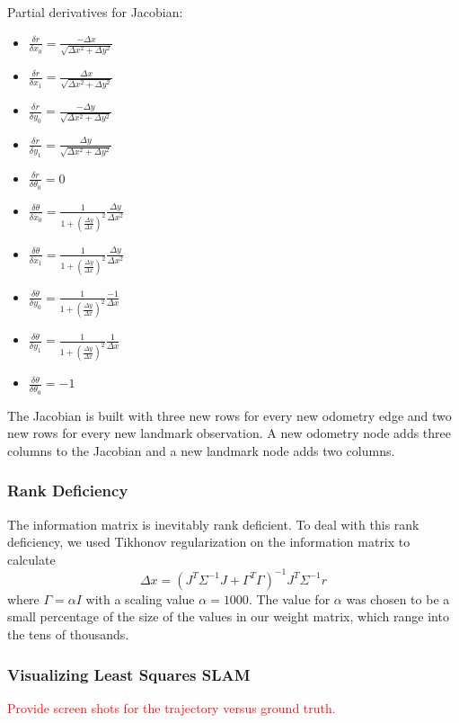 \documentclass[12pt]{article}
\begin{document}
Partial derivatives for Jacobian:
\begin{multicols}{2}
\begin{itemize}
	\item $\frac{\delta r}{\delta x_0} = \frac{- \Delta x}{\sqrt{\Delta x^2 + \Delta y^2}}$
	\item $\frac{\delta r}{\delta x_1} = \frac{\Delta x}{\sqrt{\Delta x^2 + \Delta y^2}}$
	\item $\frac{\delta r}{\delta y_0} = \frac{-\Delta y}{\sqrt{\Delta x^2 + \Delta y^2}}$
	\item $\frac{\delta r}{\delta y_1} = \frac{\Delta y}{\sqrt{\Delta x^2 + \Delta y^2}}$
	\item $\frac{\delta r}{\delta \theta_0} = 0$
	\item $\frac{\delta \theta}{\delta x_0} = \frac{1}{1 + (\frac{\Delta y}{\Delta x})^2}\frac{\Delta y}{\Delta x^2}$
	\item $\frac{\delta \theta}{\delta x_1} = \frac{1}{1 + (\frac{\Delta y}{\Delta x})^2}\frac{\Delta y}{\Delta x^2}$
	\item $\frac{\delta \theta}{\delta y_0} = \frac{1}{1 + (\frac{\Delta y}{\Delta x})^2}\frac{-1}{\Delta x}$
	\item $\frac{\delta \theta}{\delta y_1} = \frac{1}{1 + (\frac{\Delta y}{\Delta x})^2}\frac{1}{\Delta x}$
	\item $\frac{\delta \theta}{\delta \theta_0} = -1$
\end{itemize}
\end{multicols}

The Jacobian is built with three new rows for every new odometry edge and two new rows for every new landmark observation.
A new odometry node adds three columns to the Jacobian and a new landmark node adds two columns.

\subsubsection*{Rank Deficiency}
The information matrix is inevitably rank deficient.  To deal with this rank deficiency, we used Tikhonov regularization on the information matrix to calculate
$$\Delta x = (J^T \Sigma^{-1}J + \Gamma^T \Gamma)^{-1}J^T \Sigma^{-1} r$$
where $\Gamma = \alpha I$ with a scaling value $\alpha = 1000$.  The value for $\alpha$ was chosen to be a small percentage of the size of the values in our weight matrix, which range into the tens of thousands.


\subsubsection*{Visualizing Least Squares SLAM}
\textcolor{red}{Provide screen shots for the trajectory versus ground truth.}
\end{document}
